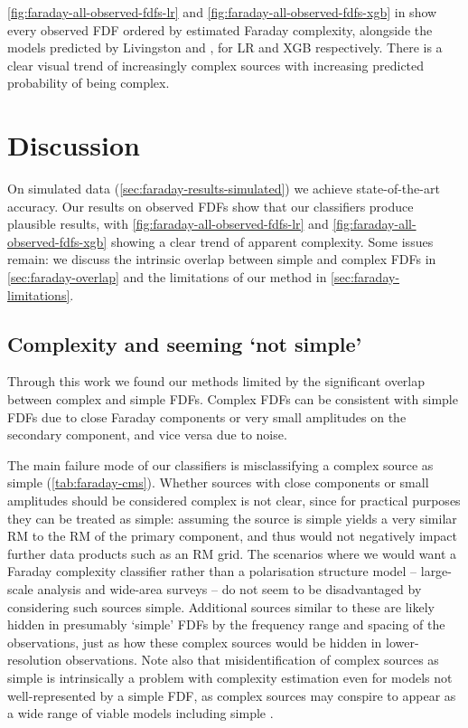     \autoref{fig:faraday-all-observed-fdfs-lr} and \autoref{fig:faraday-all-observed-fdfs-xgb} in  show every observed FDF ordered by estimated Faraday complexity, alongside the models predicted by Livingston and \citet{osullivan_broad-band_2017}, for LR and XGB respectively. There is a clear visual trend of increasingly complex sources with increasing predicted probability of being complex.

\section{Discussion}
\label{sec:faraday-discussion}

  On simulated data (\autoref{sec:faraday-results-simulated}) we achieve state-of-the-art accuracy. Our results on observed FDFs show that our classifiers produce plausible results, with \autoref{fig:faraday-all-observed-fdfs-lr} and \autoref{fig:faraday-all-observed-fdfs-xgb} showing a clear trend of apparent complexity. Some issues remain: we discuss the intrinsic overlap between simple and complex FDFs in \autoref{sec:faraday-overlap} and the limitations of our method in \autoref{sec:faraday-limitations}.

  \subsection{Complexity and seeming `not simple'}
  \label{sec:faraday-overlap}

    Through this work we found our methods limited by the significant overlap between complex and simple FDFs. Complex FDFs can be consistent with simple FDFs due to close Faraday components or very small amplitudes on the secondary component, and vice versa due to noise.

    The main failure mode of our classifiers is misclassifying a complex source as simple (\autoref{tab:faraday-cms}). Whether sources with close components or small amplitudes should be considered complex is not clear, since for practical purposes they can be treated as simple: assuming the source is simple yields a very similar RM to the RM of the primary component, and thus would not negatively impact further data products such as an RM grid. The scenarios where we would want a Faraday complexity classifier rather than a polarisation structure model -- large-scale analysis and wide-area surveys -- do not seem to be disadvantaged by considering such sources simple. Additional sources similar to these are likely hidden in presumably `simple' FDFs by the frequency range and spacing of the observations, just as how these complex sources would be hidden in lower-resolution observations. Note also that misidentification of complex sources as simple is intrinsically a problem with complexity estimation even for models not well-represented by a simple FDF, as complex sources may conspire to appear as a wide range of viable models including simple \citep{sun15comparison}.

